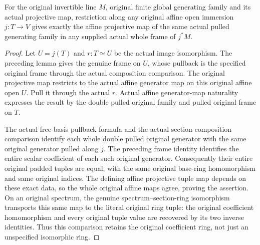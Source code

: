 \begin{lemma}
\leanok
\label{lem:kn-nadel-nef-big-generated-open-map}
For the original invertible line $M$, original finite global generating
family and its actual projective map, restriction along any original
affine open immersion $j:T\to V$ gives exactly the affine projective
map of the same actual pulled generating family in any supplied actual
whole frame of $j^*M$.
\end{lemma}
\begin{proof}
Let $U=j(T)$ and $r:T\simeq U$ be the actual image isomorphism. The
preceding lemma gives the genuine frame on $U$, whose pullback is the
specified original frame through the actual composition comparison.
The original projective map restricts to the actual affine generator
map on this original affine open $U$. Pull it through the actual $r$.
Actual affine generator-map naturality expresses the result by the
double pulled original family and pulled original frame on $T$.

The actual free-basis pullback formula and the actual section-composition
comparison identify each whole double pulled original generator with
the same original generator pulled along $j$. The preceding frame identity
identifies the entire scalar coefficient of each such original generator.
Consequently their entire original padded tuples are equal, with the
same original base-ring homomorphism and same original indices. The
defining affine projective tuple map depends on these exact data, so the
whole original affine maps agree, proving the assertion. On an original
spectrum, the genuine spectrum--section-ring isomorphism transports this
same map to the literal original ring tuple: the original coefficient
homomorphism and every original tuple value are recovered by its two
inverse identities. Thus this comparison retains the original coefficient
ring, not just an unspecified isomorphic ring.
\end{proof}

